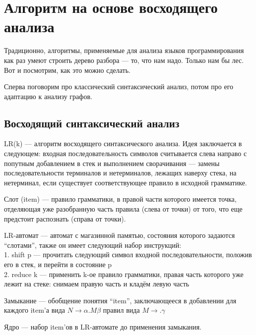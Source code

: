 \section{Алгоритм на основе восходящего анализа}

Традиционно, алгоритмы, применяемые для анализа языков программирования как раз умеют строить дерево разбора --- то, что нам надо.
Только нам бы лес.
Вот и посмотрим, как это можно сделать.

Сперва поговорим про классический синтаксический анализ, потом про его адаптацию к анализу графов.

\subsection{Восходящий синтаксический анализ}

LR(k) --- алгоритм восходящего синтаксического анализа. 
Идея заключается в следующем: входная последовательность символов считывается слева направо с попутным добавлением в стек и выполнением сворачивания --- замены последовательности терминалов и нетерминалов, лежащих наверху стека, на нетерминал, если существует соответствующее правило в исходной грамматике.

\begin{definition}
Слот (item) --- правило грамматики, в правой части которого имеется точка, отделяющая уже разобранную часть правила (слева от точки) от того, что еще предстоит распознать (справа от точки).
\end{definition}

\begin{definition}
LR-автомат --- автомат с магазинной памятью, состояния которого задаются ``слотами'', также он имеет следующий набор инструкций: \\
1. shift p --- прочитать следующий символ входной последовательности, положив его в стек, и перейти в состояние p \\
2. reduce k --- применить k-ое правило грамматики, правая часть которого уже лежит на стеке: снимаем правую часть и кладём левую часть
\end{definition}

\begin{definition}
Замыкание --- обобщение понятия ``item'', заключающееся в добавлении для каждого item'а вида $N \rightarrow \alpha.M\beta$ правил вида $M \rightarrow .\gamma$
\end{definition}

\begin{definition}
Ядро --- набор item'ов в LR-автомате до применения замыкания.
\end{definition}

